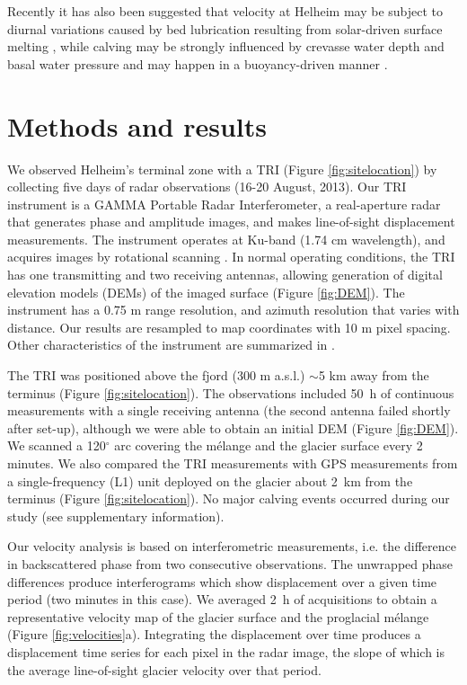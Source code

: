 Recently it has also been suggested that velocity at Helheim may be subject to diurnal variations caused by bed lubrication resulting from solar-driven surface melting \citep{davis2014tides}, while calving may be strongly influenced by crevasse water depth and basal water pressure \citep{cook2014modelling} and may happen in  a buoyancy-driven manner \citep{james2014buoyant}.


	
\section{Methods and results}
We observed Helheim's terminal zone with a TRI (Figure \ref{fig:sitelocation}) by collecting five days of radar observations (16-20 August, 2013). Our TRI instrument is a GAMMA Portable Radar Interferometer, a real-aperture radar that generates phase and amplitude images, and makes line-of-sight displacement measurements. The instrument operates at Ku-band (1.74 cm wavelength), and acquires images by rotational scanning \citep{werner2008gamma}. In normal operating conditions, the TRI has one transmitting and two receiving antennas, allowing generation of digital elevation models (DEMs) of the imaged surface (Figure \ref{fig:DEM}). The instrument has a 0.75 m range resolution, and azimuth resolution that varies with distance. Our results are resampled to map coordinates with 10 m pixel spacing. Other characteristics of the instrument are summarized in \citet{voytenko2014}.


The TRI was positioned above the fjord (300 m a.s.l.) $\sim$5 km away from the terminus (Figure \ref{fig:sitelocation}).  The observations included 50~h of continuous measurements with a single receiving antenna (the second antenna failed shortly after set-up), although we were able to obtain an initial DEM (Figure \ref{fig:DEM}). We scanned a 120$^{\circ}$ arc covering the m\'elange and the glacier surface every 2 minutes. We also compared the TRI measurements with GPS measurements from a single-frequency (L1) unit deployed on the glacier about 2~km from the terminus (Figure \ref{fig:sitelocation}).  
No major calving events occurred during our study (see supplementary information). 


Our velocity analysis is based on interferometric measurements, i.e. the difference in backscattered phase from two consecutive observations.  The unwrapped phase differences produce interferograms which show displacement over a given time period (two minutes in this case). We averaged 2~h of acquisitions to obtain a representative velocity map of the glacier surface and the proglacial m\'elange  (Figure \ref{fig:velocities}a).  Integrating the displacement over time produces a displacement time series for each pixel in the radar image, the slope of which is the average line-of-sight glacier velocity over that period. 


